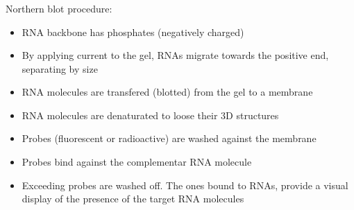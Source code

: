 \documentclass[x11names, svgnames]{beamer}
\begin{document}
\begin{frame}
  \frametitle{\three}
  Northern blot procedure:\newline
  \begin{itemize}
    \item RNA backbone has phosphates (negatively charged)
    \item By applying current to the gel, RNAs migrate towards the positive end, separating by size
    \item RNA molecules are transfered (blotted) from the gel to a membrane
    \item RNA molecules are denaturated to loose their 3D structures
    \item Probes (fluorescent or radioactive) are washed against the membrane
    \item Probes bind against the complementar RNA molecule
    \item Exceeding probes are washed off. The ones bound to RNAs, provide a visual display of the presence of the target RNA molecules
  \end{itemize}
\end{frame}
\end{document}
